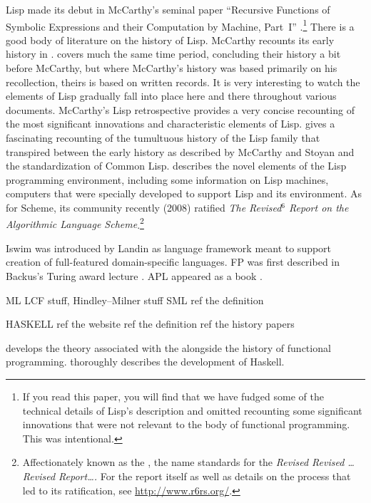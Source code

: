 Lisp made its debut in McCarthy's seminal paper ``Recursive Functions of Symbolic Expressions and their Computation by Machine, Part~I'' \citep{McCarthy:Recursive:1960}.\footnote{If you read this paper, you will find that we have fudged some of the technical details of Lisp's description and omitted recounting some significant innovations that were not relevant to the body of functional programming. This was intentional.} There is a good body of literature on the history of Lisp. McCarthy recounts its early history in \citet{McCarthy:History:1978}. \citet{Stoyan:Early:1984} covers much the same time period, concluding their history a bit before McCarthy, but where McCarthy's history was based primarily on his recollection, theirs is based on written records. It is very interesting to watch the elements of Lisp gradually fall into place here and there throughout various documents. McCarthy's Lisp retrospective \citep{McCarthy:LISP:1980} provides a very concise recounting of the most significant innovations and characteristic elements of Lisp.  gives a fascinating recounting of the tumultuous history of the Lisp family that transpired between the early history as described by McCarthy and Stoyan and the standardization of Common Lisp.  describes the novel elements of the Lisp programming environment, including some information on Lisp machines, computers that were specially developed to support Lisp and its environment. As for Scheme, its community recently (2008) ratified \textit{The Revised$^{6}$ Report on the Algorithmic Language Scheme}.\footnote{Affectionately known as the , the name standards for the \textit{Revised Revised \dots Revised Report\dots.} For the report itself as well as details on the process that led to its ratification, see \url{http://www.r6rs.org/}.}

Iswim was introduced by Landin \citep{Landin:The-next:1966} as language framework meant to support creation of full-featured domain-specific languages. FP was first described in Backus's Turing award lecture \citep{Backus:Can-programming:1978}. APL appeared as a book \citep{Iverson:A-programming:1962}.

ML LCF stuff, Hindley--Milner stuff
SML ref the definition

HASKELL
ref the website
ref the definition
ref the history papers

\citet{Hudak:Conception:1989} develops the theory associated with the \lambdacalc alongside the history of functional programming. \citet{Hudak:A-history:2007} thoroughly describes the development of Haskell.

